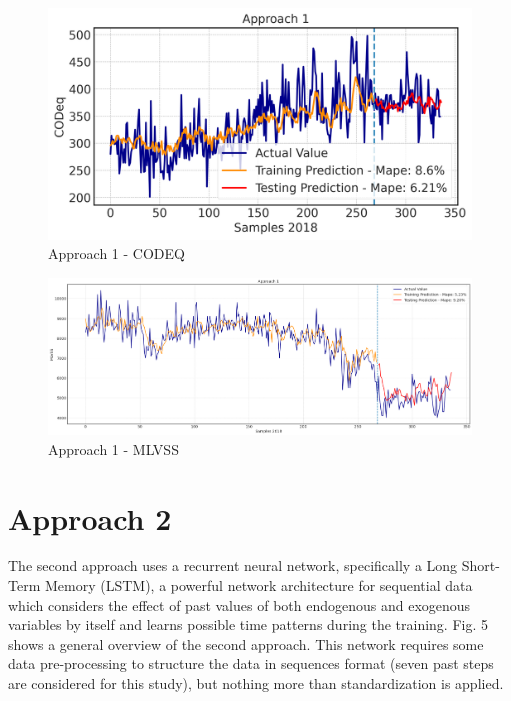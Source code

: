 \begin{figure}[h]
\centering
\includegraphics[width=\linewidth]{figures/Ch6/CODeq-1.png}
\caption{Approach 1 - CODEQ}
\label{f:App1-codeq}
\end{figure}

\begin{figure}[h]
\centering
\includegraphics[width=\linewidth]{figures/Ch4/MLVSS-1.png}
\caption{Approach 1 - MLVSS}
\label{f:App1-MLVSS}
\end{figure}

\section{Approach 2}
\label{s:Approach2}

The second approach uses a recurrent neural network, specifically a Long Short-Term Memory (LSTM), a powerful network architecture for sequential data which considers the effect of past values of both endogenous and exogenous variables by itself and learns possible time patterns during the training. Fig. 5 shows a general overview of the second approach. This network requires some data pre-processing to structure the data in sequences format (seven past steps are considered for this study), but nothing more than standardization is applied. 

